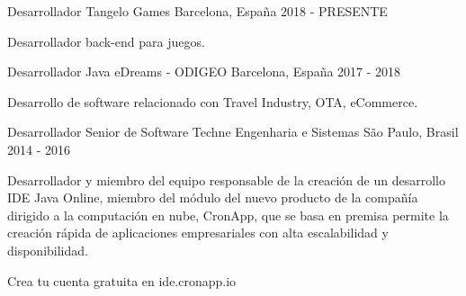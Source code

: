 

\begin{cventries}

  \cventry
    {Desarrollador} %
    {Tangelo Games} %
    {Barcelona, España} %
    {2018 - PRESENTE} %
    {
     \begin{cvitems} %
       \item {Desarrollador back-end para juegos.}
     \end{cvitems}
    }


  \cventry
    {Desarrollador Java} %
    {eDreams - ODIGEO} %
    {Barcelona, España} %
    {2017 - 2018} %
    {
      \begin{cvitems} %
        \item {Desarrollo de software relacionado con Travel Industry, OTA, eCommerce.}
      \end{cvitems}
    }

  \cventry
    {Desarrollador Senior de Software} %
    {Techne Engenharia e Sistemas} %
    {São Paulo, Brasil} %
    {2014 - 2016} %
    {
      \begin{cvitems} %
        \item {Desarrollador y miembro del equipo responsable de la creación de un desarrollo IDE Java Online, miembro del módulo del nuevo producto de la compañía dirigido a la computación en nube, CronApp, que se basa en premisa permite la creación rápida de aplicaciones empresariales con alta escalabilidad y disponibilidad.}
        \item {Crea tu cuenta gratuita en ide.cronapp.io}
      \end{cvitems}
    }


\end{cventries}
